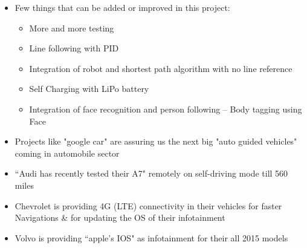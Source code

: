 \begin{itemize}
    \item Few things that can be added or improved in this project:
    \begin{itemize}
        \item More and more testing
        \item Line following with PID
        \item Integration of  robot and shortest path algorithm with no line reference
        \item Self Charging with LiPo battery
        \item Integration of face recognition and person following – Body tagging using Face
    \end{itemize}
    \item Projects like "google car" are assuring us the next big "auto guided vehicles" coming in automobile sector
    \item ``Audi has recently tested their A7" remotely on self-driving mode till 560 miles
    \item Chevrolet is providing 4G (LTE) connectivity in their vehicles for faster Navigations \& for updating the OS of their infotainment
    \item Volvo is providing ``apple’s IOS" as infotainment for their all 2015 models
\end{itemize}